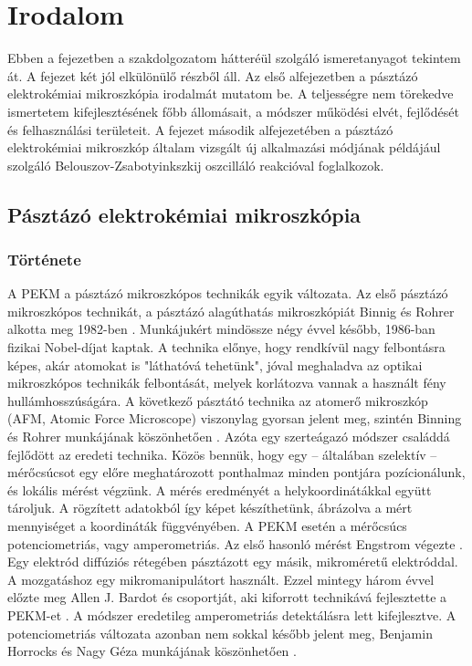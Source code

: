 \chapter{Irodalom}
\pagestyle{headings}

Ebben a fejezetben a szakdolgozatom hátteréül szolgáló ismeretanyagot tekintem át. A fejezet két jól elkülönülő részből áll. Az első alfejezetben a pásztázó elektrokémiai mikroszkópia irodalmát mutatom be. A teljességre nem törekedve ismertetem kifejlesztésének főbb állomásait, a módszer működési elvét, fejlődését és felhasználási területeit. A fejezet második alfejezetében a pásztázó elektrokémiai mikroszkóp általam vizsgált új alkalmazási módjának példájául szolgáló Belouszov-Zsabotyinkszkij oszcilláló reakcióval foglalkozok. 

\section{Pásztázó elektrokémiai mikroszkópia}




\subsection{Története}

A PEKM a pásztázó mikroszkópos technikák egyik változata. Az első pásztázó mikroszkópos technikát, a pásztázó alagúthatás mikroszkópiát Binnig és Rohrer alkotta meg 1982-ben \cite{binnig1982surface}. Munkájukért mindössze négy évvel később, 1986-ban fizikai Nobel-díjat kaptak. A technika előnye, hogy rendkívül nagy felbontásra képes, akár atomokat is "láthatóvá tehetünk", jóval meghaladva az optikai mikroszkópos technikák felbontását, melyek korlátozva vannak a használt fény hullámhosszúságára. A következő pásztátó technika az atomerő mikroszkóp (AFM, Atomic Force Microscope) viszonylag gyorsan jelent meg, szintén Binning és Rohrer munkájának köszönhetően \cite{binnig1986atomic, bennig1988atomic}. Azóta egy szerteágazó módszer családdá fejlődött az eredeti technika. Közös bennük, hogy egy -- általában szelektív -- mérőcsúcsot egy előre meghatározott ponthalmaz minden pontjára pozícionálunk, és lokális mérést végzünk. A mérés eredményét a helykoordinátákkal együtt tároljuk. A rögzített adatokból így képet készíthetünk, ábrázolva a mért mennyiséget a koordináták függvényében. A PEKM esetén a mérőcsúcs potenciometriás, vagy amperometriás. Az első hasonló mérést Engstrom végezte \cite{engstrom1986measurements}. Egy elektród diffúziós rétegében pásztázott egy másik, mikroméretű elektróddal. A mozgatáshoz egy mikromanipulátort használt. Ezzel mintegy három évvel előzte meg Allen J. Bardot és csoportját, aki kiforrott technikává fejlesztette a PEKM-et \cite{bard1989scanning}. A módszer eredetileg amperometriás detektálásra lett kifejlesztve. A potenciometriás változata azonban nem sokkal később jelent meg, Benjamin Horrocks és Nagy Géza munkájának köszönhetően \cite{horrocks1993scanning}.


